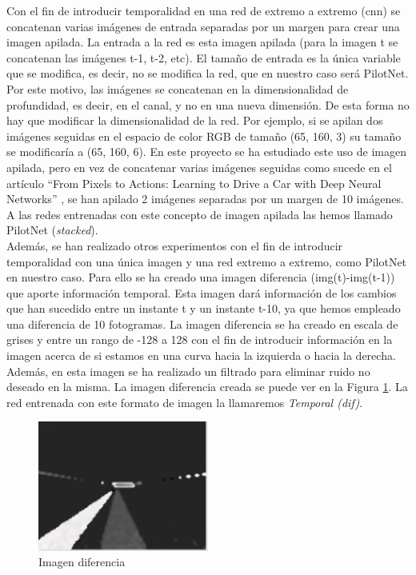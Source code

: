 Con el fin de introducir temporalidad en una red de extremo a extremo (\acrshort{cnn}) se concatenan varias imágenes de entrada separadas por un margen para crear una imagen apilada. La entrada a la red es esta imagen apilada (para la imagen t se concatenan las imágenes t-1, t-2, etc). El tamaño de entrada es la única variable que se modifica, es decir, no se modifica la red, que en nuestro caso será PilotNet. Por este motivo, las imágenes se concatenan en la dimensionalidad de profundidad, es decir, en el canal, y no en una nueva dimensión. De esta forma no hay que modificar la dimensionalidad de la red. Por ejemplo, si se apilan dos imágenes seguidas en el espacio de color RGB de tamaño (65, 160, 3) su tamaño se modificaría a (65, 160, 6). En este proyecto se ha estudiado este uso de imagen apilada, pero en vez de concatenar varias imágenes seguidas como sucede en el artículo ``From Pixels to Actions: Learning to Drive a Car with Deep Neural Networks'' \cite{pixels}, se han apilado 2 imágenes separadas por un margen de 10 imágenes. A las redes entrenadas con este concepto de imagen apilada las hemos llamado PilotNet (\textit{stacked}).\\

Además, se han realizado otros experimentos con el fin de introducir temporalidad con una única imagen y una red extremo a extremo, como PilotNet en nuestro caso. Para ello se ha creado una imagen diferencia (img(t)-img(t-1)) que aporte información temporal. Esta imagen dará información de los cambios que han sucedido entre un instante t y un instante t-10, ya que hemos empleado una diferencia de 10 fotogramas. La imagen diferencia se ha creado en escala de grises y entre un rango de -128 a 128 con el fin de introducir información en la imagen acerca de si estamos en una curva hacia la izquierda o hacia la derecha. Además, en esta imagen se ha realizado un filtrado para eliminar ruido no deseado en la misma. La imagen diferencia creada se puede ver en la Figura \ref{fig.diferencia_reg}. La red entrenada con este formato de imagen la llamaremos \textit{Temporal (dif)}.\\

\begin{figure}
\begin{center}
	\includegraphics[width=0.5\textwidth]{figures/Regresion/dif_gray_128.png}
   \caption{Imagen diferencia}
	\label{fig.diferencia_reg}
\end{center}
\end{figure}

